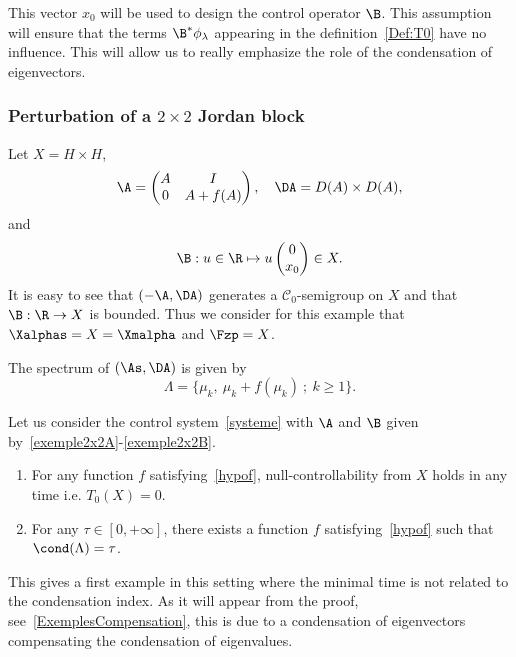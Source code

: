 \begin{rema}
This vector $x_0$ will be used to design the control operator $\B$. This assumption will ensure that the terms $\B^* \phi_\lambda$ appearing in the definition~\eqref{Def:T0} have no influence. This will allow us to really emphasize the role of the condensation of eigenvectors.
\end{rema}

\subsubsection{Perturbation of a \texorpdfstring{$2 \times 2$}{2x2} Jordan block}\label{secexample2x2}

Let $X=H \times H$,
\begin{equation}\label{exemple2x2A}
\A=
\begin{pmatrix} A & I \\ 0 & A+f(A)
\end{pmatrix},
\quad
\DA=D(A)\times D(A),
\end{equation}
and
\begin{equation}\label{exemple2x2B}
\B : u \in \R \mapsto u
\begin{pmatrix} 0\\ x_0
\end{pmatrix} \in X.
\end{equation}
It is easy to see that $(-\A,\DA)$ generates a $\mathcal C_0$-semigroup on $X$ and that $\B:\R\to X$ is bounded. Thus we consider for this example that $\Xalphas = X = \Xmalpha$ and $\Fzp=X$.

The spectrum of $(\As, \DA)$ is given by
\[
\Lambda = \{ \mu_k, \: \mu_k+f(\mu_k) \: ; \: k \geq 1\}.
\]

\begin{prop}\label{Prop:Academique1}
Let us consider the control system~\eqref{systeme} with $\A$ and $\B$ given by~\eqref{exemple2x2A}-\eqref{exemple2x2B}.
\begin{enumerate}\romanenumi
\item \label{prop5.2.1} For any function $f$ satisfying~\eqref{hypof}, null-controllability from $X$ holds in any time i.e. $T_0(X)=0$.
\smallskip
\item \label{prop5.2.2}For any $\tau \in [0,+\infty]$, there exists a function $f$ satisfying~\eqref{hypof} such that $\cond(\Lambda)= \tau$.
\end{enumerate}
\end{prop}

This gives a first example in this setting where the minimal time is not related to the condensation index. As it will appear from the proof, see~\eqref{ExemplesCompensation}, this is due to a condensation of eigenvectors compensating the condensation of eigenvalues.


